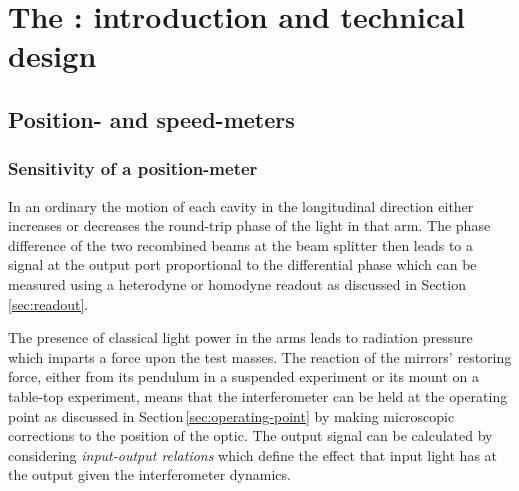 \chapter{\label{c:speedmeter-intro}The \SSMEXPT{}: introduction and technical design}

\section{Position- and speed-meters}

\subsection{\label{sec:position-meter-measurement}Sensitivity of a position-meter}
In an ordinary \FPMI{} the motion of each cavity in the longitudinal direction either increases or decreases the round-trip phase of the light in that arm. The phase difference of the two recombined beams at the beam splitter then leads to a signal at the output port proportional to the differential phase which can be measured using a heterodyne or homodyne readout as discussed in Section\,\ref{sec:readout}.

The presence of classical light power in the arms leads to radiation pressure which imparts a force upon the test masses. The reaction of the mirrors' restoring force, either from its pendulum in a suspended experiment or its mount on a table-top experiment, means that the interferometer can be held at the operating point as discussed in Section\,\ref{sec:operating-point} by making microscopic corrections to the position of the optic. The output signal can be calculated by considering \emph{input-output relations} which define the effect that input light has at the output given the interferometer dynamics.


